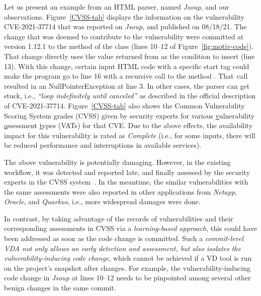 Let us present an example from an HTML parser, named {\em Jsoup}, and
our observations. Figure~\ref{CVSS-tab} displays the information on
the vulnerability CVE-2021-37714 that was reported on {\em Jsoup}, and
published on 08/18/21. The change that was deemed to contribute to the
vulnerability were committed at version 1.12.1 to the method
 of the
 class (lines 10--12 of
Figure~\ref{fig:motiv-code}). That change directly uses the value
returned from  as the condition to
insert  (line 13). With this change, certain input HTML
code with a specific start tag could make the program go to line 16
with a recursive call to the method . That~call
resulted in an NullPointerException at line 3.
In other cases, the parser can get stuck, i.e., {\em ``loop
  indefinitely until canceled''} as described in the official
description of CVE-2021-37714. Figure~\ref{CVSS-tab} also shows the
Common Vulnerability Scoring System grades (CVSS) given by security
experts for various \underline{v}ulnerability \underline{a}ssessment
\underline{t}ypes (VATs) for that CVE. Due to the above effects, the
availability impact for this vulnerability is rated as {\em Complete}
(i.e., for some inputs, there will be reduced performance and
interruptions in available services).


The above vulnerability is potentially damaging. However, in the
existing workflow, it was detected and reported late, and finally
assessed by the security experts in the CVSS
system~\cite{first-website}. In the meantime, the similar
vulnerabilities with the same assessments were also reported in other
applications from {\em Netapp}, {\em Oracle}, and {\em Quarkus}, i.e.,
more widespread damages were done.

In contrast, by taking advantage of the records of vulnerabilities and
their corresponding assessments in CVSS via a {\em learning-based
  approach}, this could have been addressed as soon as the code change
is committed.  Such a {\em commit-level VDA not only allows an early
  detection and assessment, but also isolates the
  vulnerability-inducing code change}, which cannot be achieved if a
VD tool is run on the project's snapshot after changes.  For example,
the vulnerability-inducing code change in {\em Jsoup} at lines
10--12 needs to be pinpointed among several other benign changes in
the same commit.

